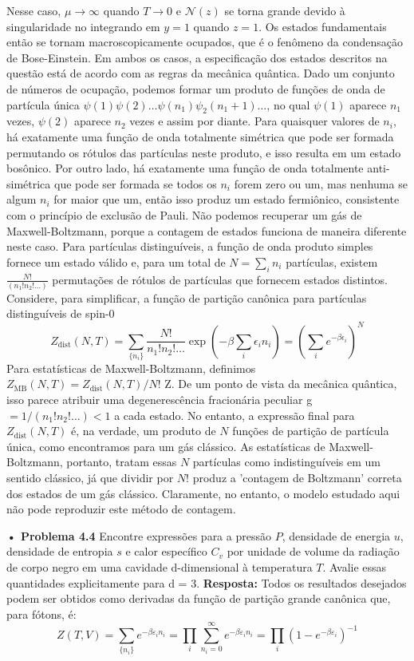 \documentclass[12pt]{article}
\begin{document}
Nesse caso, $\mu \rightarrow \infty$ quando $T \rightarrow 0$ e $\mathcal{N}(z) $ se torna grande devido à singularidade no integrando em $y = 1$ quando $z = 1$. Os estados fundamentais então se tornam macroscopicamente ocupados, que é o fenômeno da condensação de Bose-Einstein. Em ambos os casos, a especificação dos estados descritos na questão está de acordo com as regras da mecânica quântica. Dado um conjunto de números de ocupação, podemos formar um produto de funções de onda de partícula única $\psi(1) \psi(2) \dots \psi(n_1) \psi_2(n_1 + 1) \dots$, no qual $\psi(1)$ aparece $n_1$ vezes, $ \psi(2) $ aparece $n_2$ vezes e assim por diante. Para quaisquer valores de $n_i$, há exatamente uma função de onda totalmente simétrica que pode ser formada permutando os rótulos das partículas neste produto, e isso resulta em um estado bosônico. Por outro lado, há exatamente uma função de onda totalmente anti-simétrica que pode ser formada se todos os $n_i$ forem zero ou um, mas nenhuma se algum $n_i$ for maior que um, então isso produz um estado fermiônico, consistente com o princípio de exclusão de Pauli. 
Não podemos recuperar um gás de Maxwell-Boltzmann, porque a contagem de estados funciona de maneira diferente neste caso. Para partículas distinguíveis, a função de onda produto simples fornece um estado válido e, para um total de $N = \sum_i n_i$ partículas, existem $\frac{N!}{(n_1! n_2! \dots)}$ permutações de rótulos de partículas que fornecem estados distintos. Considere, para simplificar, a função de partição canônica para partículas distinguíveis de spin-0 
\[
Z_{\text{dist}}(N, T) = \sum_{\{n_i\}} \frac{N!}{n_1! n_2! \dots} \exp \left( -\beta \sum_i \epsilon_i n_i \right) 
= \left( \sum_i e^{-\beta \epsilon_i} \right)^N
\]
Para estatísticas de Maxwell-Boltzmann, definimos $Z_{\text{MB}}(N, T) = Z_{\text{dist}}(N, T)/N! $ Z. De um ponto de vista da mecânica quântica, isso parece atribuir uma degenerescência fracionária peculiar g$ = 1/(n_1! n_2! \dots) < 1$ a cada estado. No entanto, a expressão final para $Z_{\text{dist}}(N, T)$ é, na verdade, um produto de $N$ funções de partição de partícula única, como encontramos para um gás clássico. As estatísticas de Maxwell-Boltzmann, portanto, tratam essas $N$ partículas como indistinguíveis em um sentido clássico, já que dividir por $N!$ produz a 'contagem de Boltzmann' correta dos estados de um gás clássico. Claramente, no entanto, o modelo estudado aqui não pode reproduzir este método de contagem. 

\textbf{• Problema 4.4} Encontre expressões para a pressão $P$, densidade de energia $u$, densidade de entropia $s$ e calor específico $C_v$ por unidade de volume da radiação de corpo negro em uma cavidade d-dimensional à temperatura $T$. Avalie essas quantidades explicitamente para d = 3. 
\textbf{Resposta:} Todos os resultados desejados podem ser obtidos como derivadas da função de partição grande canônica que, para fótons, é:
\[
Z(T, V) = \sum_{\{n_i\}} e^{-\beta \varepsilon_i n_i} = \prod_i \sum_{n_i=0}^\infty e^{-\beta \varepsilon_i n_i} = \prod_i (1 - e^{-\beta \varepsilon_i})^{-1}
\]
\end{document}
